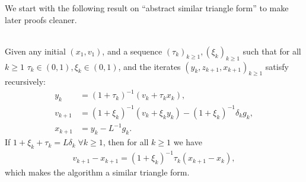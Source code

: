 \documentclass[12pt]{article}
\begin{document}
    We start with the following result on ``abstract similar triangle form'' to make later proofs cleaner.
    \begin{proposition}\label{prop:abs-st-form}\;\\
        Given any initial $(x_1, v_1)$, and a sequence $(\tau_k)_{k \ge 1}, (\xi_k)_{k \ge 1}$ such that for all $k \ge 1$ $\tau_k \in (0, 1), \xi_k \in (0, 1)$, and the iterates $(y_k, z_{k + 1}, x_{k + 1})_{k \ge 1}$ satisfy recursively:
        \begin{align*}
            y_k &= (1 + \tau_k)^{-1}(v_k + \tau_k x_k),
            \\
            v_{k + 1} &= (1 + \xi_k)^{-1}(v_k + \xi_k y_k) - (1 + \xi_k)^{-1}\delta_k g_k,
            \\
            x_{k + 1} &= y_k - L^{-1} g_k.
        \end{align*}
        If $1 + \xi_k + \tau_k = L\delta_k\; \forall k \ge 1$, then for all $k \ge 1$ we have
        \begin{align}\label{eqn:abs-st-key}
            v_{k + 1} - x_{k + 1} = (1 + \xi_k)^{-1}\tau_k(x_{k + 1} - x_k),
        \end{align}
        which makes the algorithm a similar triangle form.
    \end{proposition}
\end{document}
